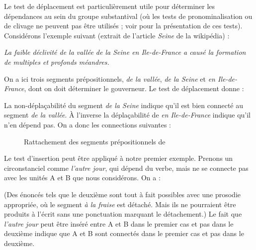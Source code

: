 Le test de déplacement est particulièrement utile pour déterminer les dépendances au sein du groupe substantival (où les tests de pronominalisation ou de clivage ne peuvent pas être utilisés ; voir  pour la présentation de ces tests). Considérons l’exemple suivant (extrait de l’article \textit{Seine} de la wikipédia) :

\ea \textit{La faible déclivité de la vallée de la Seine en Ile-de-France a causé la formation de multiples et profonds méandres.}
\label{ex:Seine}\z

On a ici trois segments prépositionnels, \textit{de la vallée}, \textit{de la Seine} et \textit{en Ile-de-France}, dont on doit déterminer le gouverneur. Le test de déplacement donne :

\ea
  \z
\z
La non-déplaçabilité du segment \textit{de la Seine} indique qu’il est bien connecté au segment \textit{de la vallée}. À l’inverse la déplaçabilité de \textit{en Ile-de-France} indique qu’il n’en dépend pas. On a donc les connections suivantes :

\begin{figure}
\small{}
\caption{Rattachement des segments prépositionnels de }
\end{figure}

Le test d’insertion peut être appliqué à notre premier exemple. Prenons un circonstanciel comme \textit{l’autre jour}, qui dépend du verbe, mais ne se connecte pas avec les unités A et B que nous considérons. On a :

\ea
  \z
\z
(Des énoncés tels que le deuxième sont tout à fait possibles avec une prosodie appropriée, où le segment \textit{à la fraise} est détaché. Mais ils ne pourraient être produits à l’écrit sans une ponctuation marquant le détachement.) Le fait que \textit{l’autre jour} peut être inséré entre A et B dans le premier cas et pas dans le deuxième indique que A et B sont connectés dans le premier cas et pas dans le deuxième.

